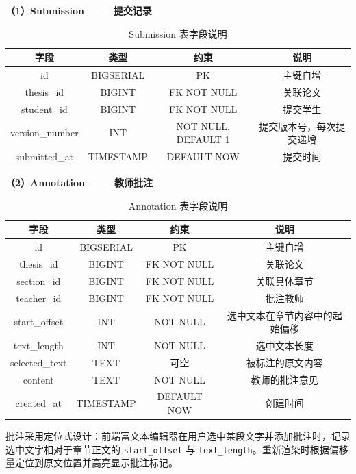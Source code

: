 \textbf{（1）Submission —— 提交记录}

\begin{table}[htbp]
\centering
\caption{Submission 表字段说明}
\label{tab:submission-fields}
\begin{tabular}{|c|c|c|c|}
\hline
\textbf{字段} & \textbf{类型} & \textbf{约束} & \textbf{说明} \\
\hline
id & BIGSERIAL & PK & 主键自增 \\
\hline
thesis\_id & BIGINT & FK NOT NULL & 关联论文 \\
\hline
student\_id & BIGINT & FK NOT NULL & 提交学生 \\
\hline
version\_number & INT & NOT NULL, DEFAULT 1 & 提交版本号，每次提交递增 \\
\hline
submitted\_at & TIMESTAMP & DEFAULT NOW & 提交时间 \\
\hline
\end{tabular}
\end{table}

\textbf{（2）Annotation —— 教师批注}

\begin{table}[htbp]
\centering
\caption{Annotation 表字段说明}
\label{tab:annotation-fields}
\begin{tabular}{|c|c|c|c|}
\hline
\textbf{字段} & \textbf{类型} & \textbf{约束} & \textbf{说明} \\
\hline
id & BIGSERIAL & PK & 主键自增 \\
\hline
thesis\_id & BIGINT & FK NOT NULL & 关联论文 \\
\hline
section\_id & BIGINT & FK NOT NULL & 关联具体章节 \\
\hline
teacher\_id & BIGINT & FK NOT NULL & 批注教师 \\
\hline
start\_offset & INT & NOT NULL & 选中文本在章节内容中的起始偏移 \\
\hline
text\_length & INT & NOT NULL & 选中文本长度 \\
\hline
selected\_text & TEXT & 可空 & 被标注的原文内容 \\
\hline
content & TEXT & NOT NULL & 教师的批注意见 \\
\hline
created\_at & TIMESTAMP & DEFAULT NOW & 创建时间 \\
\hline
\end{tabular}
\end{table}

批注采用定位式设计：前端富文本编辑器在用户选中某段文字并添加批注时，记录选中文字相对于章节正文的 \texttt{start\_offset} 与 \texttt{text\_length}。重新渲染时根据偏移量定位到原文位置并高亮显示批注标记。

